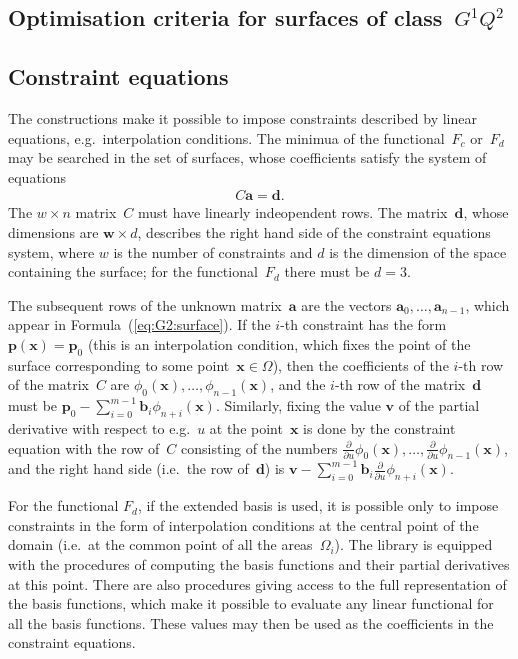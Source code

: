 \subsection{Optimisation criteria for surfaces of class~$G^1Q^2$}


\subsection{Constraint equations}

\begin{sloppypar}
The constructions make it possible to impose constraints described by linear
equations, e.g.\ interpolation conditions. The minimua of the functional~$F_c$
or~$F_d$ may be searched in the set of surfaces, whose coefficients satisfy
the system of equations
\begin{align}\label{eq:constraints}
  C\bm{a} = \bm{d}.
\end{align}
The $w\times n$ matrix~$C$ must have linearly indeopendent rows.
The matrix~$\bm{d}$, whose dimensions are $\bm{w}\times d$, describes the
right hand side of the constraint equations system, where $w$ is the number
of constraints and $d$ is the dimension of the space containing the surface;
for the functional~$F_d$ there must be $d=3$.%
\end{sloppypar}

The subsequent rows of the unknown matrix~$\bm{a}$ are the vectors
$\bm{a}_0,\ldots,\bm{a}_{n-1}$, which appear in Formula~(\ref{eq:G2:surface}).
If the $i$-th constraint has the form
$\bm{p}(\bm{x})=\bm{p}_0$ (this is an interpolation condition, which fixes
the point of the surface corresponding to some point~$\bm{x}\in\varOmega$),
then the coefficients of the $i$-th row of the matrix~$C$ are
$\phi_0(\bm{x}),\ldots,\phi_{n-1}(\bm{x})$, and the $i$-th row
of the matrix~$\bm{d}$ must be
$\bm{p}_0-\sum_{i=0}^{m-1}\bm{b}_i\phi_{n+i}(\bm{x})$. Similarly, fixing
the value $\bm{v}$ of the partial derivative with respect to e.g.~$u$
at the point~$\bm{x}$ is done by the constraint equation with the row of~$C$
consisting of the numbers
$\frac{\partial}{\partial u}\phi_0(\bm{x}),\ldots,%
\frac{\partial}{\partial u}\phi_{n-1}(\bm{x})$, and the right hand side
(i.e.\ the row of~$\bm{d}$) is $\bm{v}-\sum_{i=0}^{m-1}\bm{b}_i%
\frac{\partial}{\partial u}\phi_{n+i}(\bm{x})$.

For the functional $F_d$, if the extended basis is used,
it is possible only to impose constraints in the form of interpolation
conditions at the central point of the domain (i.e.\ at the common
point of all the areas~$\varOmega_i$).
The library is equipped with the procedures of computing the basis functions
and their partial derivatives at this point. There are also procedures
giving access to the full representation of the basis functions,
which make it possible to evaluate any linear functional for all the basis
functions. These values may then be used as the coefficients in the
constraint equations.

